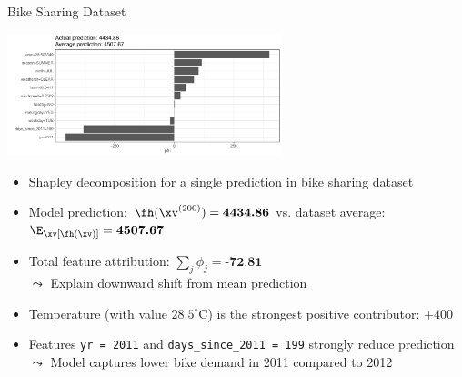 \documentclass[11pt,compress,t,notes=noshow, aspectratio=169, xcolor=table]{beamer}
\begin{document}

\begin{frame}{Bike Sharing Dataset}

\begin{center}
\includegraphics[width=0.6\textwidth]{figure/shapley-bike.pdf}%
\end{center}

\begin{itemize}%
  \item Shapley decomposition for a single prediction in bike sharing dataset %
  \item Model prediction: $\fh(\xv^{(200)}) = \textbf{4434.86}$ vs. dataset average: $\E_\xv[\fh(\xv)] = \textbf{4507.67}$
  \item Total feature attribution: $\sum_j \phi_j = \textbf{-72.81}$\\
  $\leadsto$ Explain downward shift from mean prediction
  \item Temperature (with value $28.5^\circ$C) is the strongest positive contributor: $+400$
  \item Features \texttt{yr = 2011} and \texttt{days\_since\_2011 = 199} strongly reduce prediction\\
  $\leadsto$ Model captures lower bike demand in 2011 compared to 2012
\end{itemize}
\end{frame}
\end{document}
